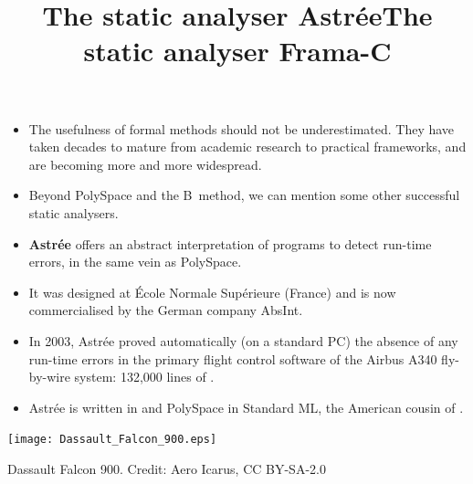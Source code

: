 \documentclass[wide]{slides}
\begin{document}
\begin{slide}
  \title{The static analyser Astr\'ee}

  \begin{itemize}

    \item The usefulness of formal methods should not be
      underestimated. They have taken decades to mature from academic
      research to practical frameworks, and are becoming more and more
      widespread.

    \item Beyond PolySpace and the B~method, we can mention some other
      successful static analysers.

    \item \textbf{Astr\'ee} offers an abstract interpretation of
      \Clang programs to detect run\hyp{}time errors, in the same vein
      as PolySpace.

    \item It was designed at \'Ecole Normale Sup\'erieure (France) and
      is now commercialised by the German company AbsInt.

    \item In 2003, Astr\'ee proved automatically (on a standard PC)
      the absence of any run\hyp{}time errors in the primary flight
      control software of the Airbus A340 fly-by-wire system: 132,000
      lines of \Clang.

    \item Astr\'ee is written in \OCaml and PolySpace in
      \textsf{Standard ML}, the American cousin of \OCaml.

  \end{itemize}

\end{slide}

\begin{slide}
  \title{The static analyser Frama-C}

  \begin{center}
    \texttt{[image: Dassault\_Falcon\_900.eps]}
  \end{center}

  \centerline{Dassault Falcon 900. Credit:  Aero Icarus, CC BY-SA-2.0}

\end{slide}
\end{document}
